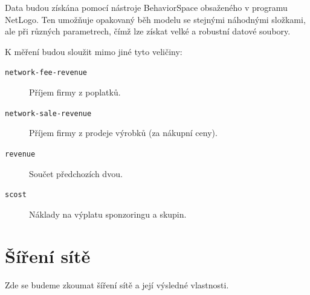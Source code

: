 \documentclass[a4wide,12pt]{report}
\begin{document}
Data budou získána pomocí nástroje BehaviorSpace obsaženého v programu NetLogo. Ten umožňuje opakovaný běh modelu se stejnými náhodnými složkami, ale při různých parametrech, čímž lze získat velké a robustní datové soubory.

K měření budou sloužit mimo jiné tyto veličiny:
\begin{description}
\item[\texttt{network-fee-revenue}] Příjem firmy z poplatků.
\item[\texttt{network-sale-revenue}] Příjem firmy z prodeje výrobků (za nákupní ceny).
\item[\texttt{revenue}] Součet předchozích dvou.
\item[\texttt{scost}] Náklady na výplatu sponzoringu a skupin.
\end{description}
\section{Šíření sítě}
Zde se budeme zkoumat šíření sítě a její výsledné vlastnosti. 
\end{document}
